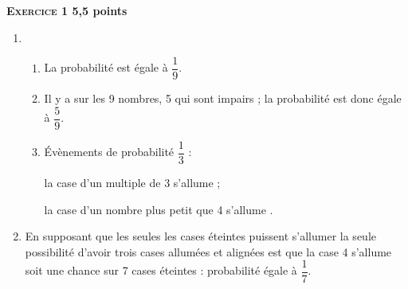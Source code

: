 \textbf{\textsc{Exercice 1} \hfill 5,5 points}

\medskip

%
%
%

\begin{enumerate}
\item 
	\begin{enumerate}
		\item %
La probabilité est égale à $\dfrac{1}{9}$.
		\item %
		Il y a sur les 9 nombres, 5 qui sont impairs ; la probabilité est donc égale à $\dfrac{5}{9}$.		
		\item %
Évènements de probabilité  $\dfrac{1}{3}$ : 

\og la case d'un multiple de 3 s'allume \fg ;

\og la case d'un nombre plus petit que 4 s'allume \fg.
	\end{enumerate}
\item %
En supposant que les seules les cases éteintes puissent s'allumer la seule possibilité d'avoir trois cases allumées et alignées est que la case 4 s'allume soit une chance sur 7 cases éteintes : probabilité égale à $\dfrac{1}{7}$.
\end{enumerate}

\vspace{0,5cm}

